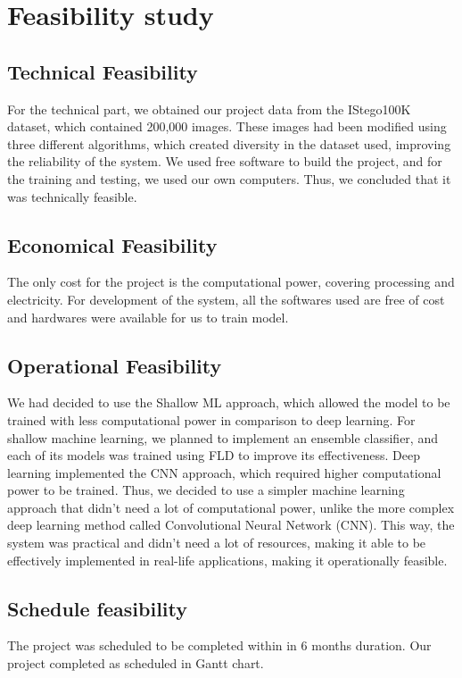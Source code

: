 \chapter{Feasibility study} \sloppy
{} 
\section{Technical Feasibility} 
For the technical part, we obtained our project data from the IStego100K\cite{7} dataset, which contained 200,000 images. These images had been modified using three different algorithms, which created diversity in the dataset used, improving the reliability of the system. We used free software to build the project, and for the training and testing, we used our own computers. Thus, we concluded that it was technically feasible.

\section{Economical Feasibility}
The only cost for the project is the computational power, covering processing and electricity.
For development of the system, all the softwares used are free of cost and hardwares
were available for us to train model.

\section{Operational Feasibility}
We had decided to use the Shallow ML approach, which allowed the model to be trained with less computational power in comparison to deep learning. For shallow machine learning, we planned to implement an ensemble classifier, and each of its models was trained using FLD to improve its effectiveness. Deep learning implemented the CNN approach, which required higher computational power to be trained. Thus, we decided to use a simpler machine learning approach that didn't need a lot of computational power, unlike the more complex deep learning method called Convolutional Neural Network (CNN). This way, the system was practical and didn't need a lot of resources, making it able to be effectively implemented in real-life applications, making it operationally feasible.

\section{Schedule feasibility} 
The project was scheduled to be completed within in 6 months duration. Our project completed as scheduled in Gantt chart.

